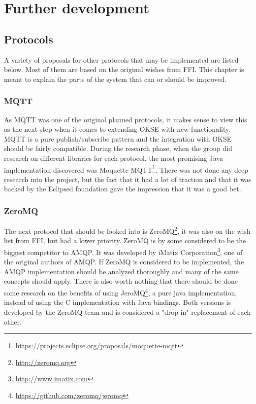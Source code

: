 
\chapter{Further development}

\section{Protocols}
A variety of proposals for other protocols that may be implemented are listed below. Most of them are based on the original wishes from FFI. This chapter is meant to explain the parts of the system that can or should be improved. 

\subsection{MQTT}
As MQTT was one of the original planned protocols, it makes sense to view this as the next step when it comes to extending OKSE with new functionality. MQTT is a pure publish/subscribe pattern and the integration with OKSE should be fairly compatible. 
During the research phase, when the group did research on different libraries for each protocol, the most promising Java implementation discovered was Moquette MQTT\footnote{\url{https://projects.eclipse.org/proposals/moquette-mqtt}}. There was not done any deep research into the project, but the fact that it had a lot of traction and that it was backed by the Eclipsed foundation gave the impression that it was a good bet.

\subsection{ZeroMQ}
The next protocol that should be looked into is ZeroMQ\footnote{\url{http://zeromq.org}}, it was also on the wish list from FFI, but had a lower priority. ZeroMQ is by some considered to be the biggest competitor to AMQP. It was developed by iMatix Corporation\footnote{\url{http://www.imatix.com}}, one of the original authors of AMQP. If ZeroMQ is considered to be implemented, the AMQP implementation should be analyzed thoroughly and many of the same concepts should apply. There is also worth nothing that there should be done some research on the benefits of using JeroMQ\footnote{\url{https://github.com/zeromq/jeromq}}, a pure java implementation, instead of using the C implementation with Java bindings. Both versions is developed by the ZeroMQ team and is considered a "drop-in" replacement of each other.

